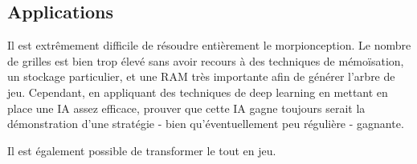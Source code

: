 \documentclass[10pt]{article}
\begin{document}
\begin{enumerate}
\begin{itemize}
\subsection{Applications}
Il est extrêmement difficile de résoudre entièrement le morpionception. Le nombre de grilles est bien trop élevé sans avoir recours à des techniques de mémoïsation, un stockage particulier, et une RAM très importante afin de générer l'arbre de jeu. Cependant, en appliquant des techniques de deep learning en mettant en place une IA assez efficace, prouver que cette IA gagne toujours serait la démonstration d'une stratégie - bien qu'éventuellement peu régulière - gagnante.
\par Il est également possible de transformer le tout en jeu.

\end{itemize}
\end{enumerate}
\end{document}
